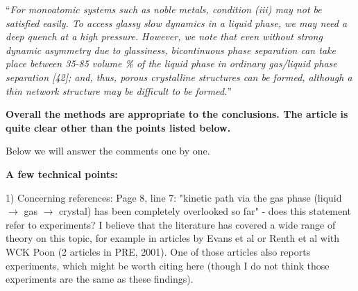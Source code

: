 \documentclass[11pt,a4paper]{article}
\newenvironment{referee}%
{\bigskip\singlespacing\bf}%
{\par\bigskip}
\begin{document}
``{\it For monoatomic systems such as noble metals, condition (iii) may not be satisfied easily. 
To access glassy slow dynamics in a liquid phase, we may need a deep quench at a high pressure. However, we note that even without strong dynamic asymmetry 
due to glassiness, bicontinuous phase separation can take place between 35-85 volume \% of the liquid phase in ordinary gas/liquid phase separation [42]; 
and, thus, porous crystalline structures can be formed, although a thin network structure may be difficult to be formed.}''


\begin{referee}
Overall the methods are appropriate to the conclusions. The article is quite clear other than the points listed below.
\end{referee}

Below we will answer the comments one by one. 


\begin{referee}
A few technical points:

1) Concerning references: Page 8, line 7: "kinetic path via the gas phase (liquid $\rightarrow$ gas $\rightarrow$ crystal) has been completely overlooked so far" - does this statement refer to experiments? I believe that the literature has covered a wide range of theory on this topic, for example in articles by Evans et al or Renth et al with WCK Poon (2 articles in PRE, 2001). One of those articles also reports experiments, which might be worth citing here (though I do not think those experiments are the same as these findings).
\end{referee}
\end{document}
